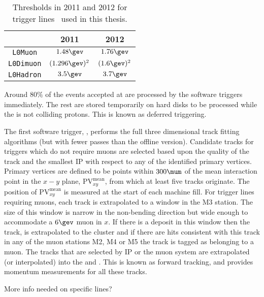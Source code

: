\begin{table}
  \caption[L0 trigger threholds]
  {\small
    Thresholds in 2011 and 2012 for \lone trigger lines~\cite{Albrecht:2013fba} used in this thesis.
  }
  \label{tab:lhcb:trigger}
  \begin{center}
    \begin{tabular}{ccc}\toprule
      &2011&2012\\\midrule
      {\tt L0Muon} & $1.48\gev$ & $1.76\gev$ \\
      {\tt L0Dimuon} & $(1.296\gev)^2$ & $(1.6\gev)^2$ \\
      {\tt L0Hadron} & $3.5\gev$ & $3.7\gev$ \\
      \bottomrule
    \end{tabular}
  \end{center}
\end{table}

Around $80\%$ of the events accepted at \lone are processed by the software triggers immediately.
The rest are stored temporarily on hard disks to be processed while the \lhc is not colliding protons.
This is known as deferred triggering.

The first software trigger, \hltone, performs the full three dimensional \velo track fitting
algorithms (but with fewer passes than the offline version).
Candidate \velo tracks for triggers which do not require muons are selected based upon the quality of the
\velo track and the smallest IP with respect to any of the identified primary vertices.
Primary vertices are defined to be points within $300\mum$ of the mean
interaction point in the $x-y$ plane, $\mathrm{PV}^\mathrm{mean}_{xy}$, from which at least five
tracks originate.
The position of $\mathrm{PV}^\mathrm{mean}_{xy}$ is measured at the start of each \lhc machine
fill.
For trigger lines requiring muons, each \velo track is extrapolated to a window in the M3
station.
The size of this window is narrow in the non-bending direction but wide enough to accommodate a $6\gev$
muon in $x$.
If there is a deposit in this window then the \velo track, is extrapolated to the cluster and if
there are hits consistent with this track in any of the muon stations M2, M4 or M5 the track is
tagged as belonging to a muon.
The \velo tracks that are selected by IP or the muon system are extrapolated (or interpolated) into
the \intr and \ot.
This is known as forward tracking, and provides momentum measurements for all these tracks.

More info needed on specific lines?

